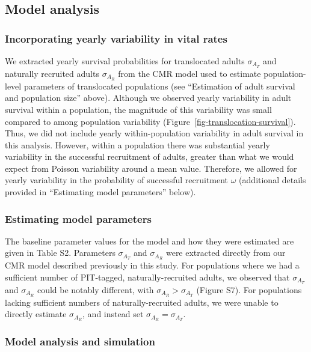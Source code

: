 \documentclass[9pt,twocolumn,twoside,lineno]{pnas-new}
\begin{document}
{\hypertarget{model-analysis}{%
\subsection*{Model analysis}\label{model-analysis}}

\subsubsection*{Incorporating yearly variability in vital rates}

We extracted yearly survival probabilities for translocated adults
\(\sigma_{A_T}\) and naturally recruited adults \(\sigma_{A_R}\) from
the CMR model used to estimate population-level parameters of
translocated populations (see ``Estimation of adult survival and
population size'' above). Although we observed yearly variability in
adult survival within a population, the magnitude of this variability
was small compared to among population variability
(Figure~\ref{fig-translocation-survival}). Thus, we did not include
yearly within-population variability in adult survival in this analysis.
However, within a population there was substantial yearly variability in
the successful recruitment of adults, greater than what we would expect
from Poisson variability around a mean value. Therefore, we allowed for
yearly variability in the probability of successful recruitment
\(\omega\) (additional details provided in ``Estimating model
parameters'' below).

\subsubsection*{Estimating model parameters}

The baseline parameter values for the model and how they were estimated
are given in Table S2. Parameters
\(\sigma_{A_T}\) and \(\sigma_{A_R}\) were extracted directly from our
CMR model described previously in this study. For populations where we
had a sufficient number of PIT-tagged, naturally-recruited adults, we
observed that \(\sigma_{A_T}\) and \(\sigma_{A_R}\) could be notably
different, with \(\sigma_{A_R} > \sigma_{A_T}\)
(Figure S7). For populations lacking
sufficient numbers of naturally-recruited adults, we were unable to
directly estimate \(\sigma_{A_R}\), and instead set
\(\sigma_{A_R} = \sigma_{A_T}\).

\subsubsection*{Model analysis and simulation}

}
\end{document}
